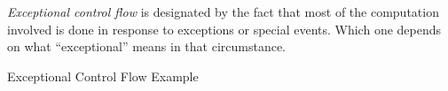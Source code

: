 \begin{definition}\label{def:Exceptional_Control_Flow}
  \emph{Exceptional control flow} is designated by the fact that most of the computation involved is done in response to exceptions or special events.
  Which one depends on what ``exceptional'' means in that circumstance.
\end{definition}

\begin{listing}[h!tbp]
\caption{Exceptional Control Flow Example}
\label{lst:Exceptional_Control_Flow}
\end{listing}


